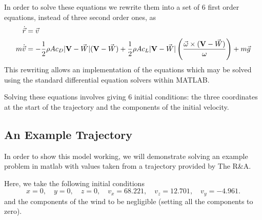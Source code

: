 In order to solve these equations we rewrite them into a set of 6 first order equations, instead of 
three second order ones, as
\begin{subequations}
\begin{align}
\dot{\vec{r}} &= \vec{v} \\
m \dot{\vec{v}} &= - \frac{1}{2}\rho A c_D |\mathbf{V} - \vec{W}|(\mathbf{V} - \vec{W}) + \frac{1}{2} \rho A c_L
|\mathbf{V} - \vec{W}| \left(\frac{\vec{\omega} \times (\mathbf{V} - \vec{W})}{\omega}\right) + m \vec{g}
\end{align}
\end{subequations}
This rewriting allows an implementation of the equations which may be solved using the standard
differential equation solvers within MATLAB.

Solving these equations involves giving 6 initial conditions: the three coordinates at the start of
the trajectory and the components of the initial velocity.

\subsection{An Example Trajectory} \label{rr-example}

In order to show this model working, we will demonstrate solving an example problem in matlab with
values taken from a trajectory provided by The R\&A.

Here, we take the following initial conditions
\[
x = 0, \quad y = 0, \quad z = 0, \quad v_x = 68.221, \quad v_z = 12.701, \quad v_y = -4.961 .
\]
and the components of the wind to be negligible (setting all the components to zero).

